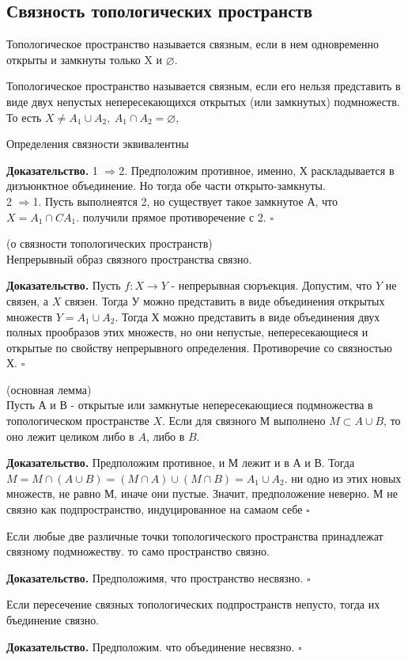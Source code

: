 \subsection{Связность топологических пространств}
\begin{defin}
Топологическое пространство называется связным, если в нем одновременно 
открыты и замкнуты только X и $\varnothing$.
\end{defin}
\begin{defin}
Топологическое пространство называется связным, если его нельзя представить
в виде двух непустых непересекающихся открытых (или замкнутых) подмножеств.
То есть $X\ne A_1\cup A_2,~A_1\cap A_2=\varnothing,$
\end{defin}
\begin{theor}
 Определения связности эквивалентны
\end{theor}
\textbf{Доказательство.} 1 $\Rightarrow$2. Предположим противное, именно, 
Х раскладывается в дизъюнктное объединение. Но тогда обе части 
открыто-замкнуты. \\
2 $\Rightarrow$1. Пусть выполнеятся 2, но существует такое замкнутое А, что 
$X=A_1\cap CA_1$. получили прямое противоречение с 2.
$\square$ 
\begin{theor}
    (о связности топологических пространств)\\
    Непрерывный образ связного пространства связно.
\end{theor}
\textbf{Доказательство.} Пусть $f\colon X\to Y$ -  непрерывная сюръекция. 
Допустим, что $Y$ не связен, а  $X$ связен. Тогда У можно
представить в виде объединения открытых множеств $Y=A_1\cup A_2$.  
Тогда Х можно представить в виде объединения двух полных прообразов этих
множеств,
но они непустые, непересекающиеся и открытые по свойству непрерывного 
определения. Противоречие со связностью Х.
$\square$ \\
\begin{theor}
    (основная лемма)\\
    Пусть А и В - открытые или замкнутые непересекающиеся подмножества в
    топологическом пространстве $X$. Если для связного М выполнено
    $M\subset A\cup B$, то оно лежит целиком либо в $A$, либо в $B$.
\end{theor}
\textbf{Доказательство.}  Предположим противное, и М лежит и в А и В.
Тогда $M=M\cap(A\cup B)=(M\cap A)\cup(M\cap B)=A_1\cup A_2$. ни одно из 
этих новых множеств, не равно М, иначе они пустые. Значит, предположение 
неверно. М не связно как подпространство, индуцированное на самаом себе
$\square$ 
\begin{theor}
Если любые две различные точки топологического пространства принадлежат
связному подмножеству. то само пространство связно.
\end{theor}
\textbf{Доказательство.} Предположимя, что пространство несвязно.  
$\square$ 



 
\begin{theor}
Если пересечение связных топологических подпространств непусто, тогда их 
бъединение связно.
\end{theor}
\textbf{Доказательство.} Предположим. что объединение несвязно. 
$\square$ 






